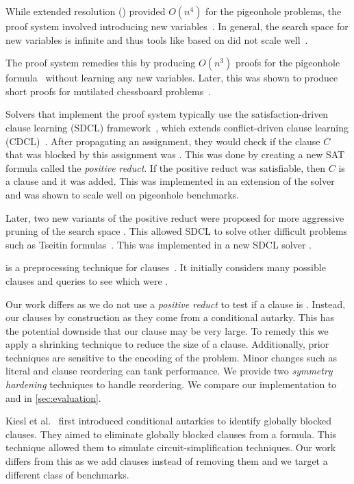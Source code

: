 

 While extended resolution (\er) provided $O(n^4)$ for the pigeonhole problems, the proof system involved introducing new variables~\cite{er}. In general, the search space for new variables is infinite and thus tools like \glucoser based on \er did not scale well~\cite{glucoser}.

The \pr proof system remedies this by producing $O(n^3)$ proofs for the pigeonhole formula~\cite{prclauses} without learning any new variables. Later, this was shown to produce short proofs for mutilated chessboard problems~\cite{mutilatedchessboard-pr}. 

Solvers that implement the \pr proof system typically use the satisfaction-driven clause learning (SDCL) framework~\cite{sdcl}, which extends conflict-driven clause learning (CDCL)~\cite{cdcl}. 
After propagating an assignment, they would check if the clause $C$ that was blocked by this assignment was \pr. This was done by creating a new SAT formula called the \emph{positive reduct}. If the positive reduct was satisfiable, then $C$ is a \pr clause and it was added. This was implemented in an extension of the solver \lingeling and was shown to scale well on pigeonhole benchmarks.

Later, two new variants of the positive reduct were proposed for more aggressive pruning of the search space \cite{sadical}. This allowed SDCL to solve other difficult problems such as Tseitin formulas~\cite{hardexamplesresolution}. This was implemented in a new SDCL solver \sadical.


\prelearn is a preprocessing technique for \pr clauses~\cite{prelearn}. It initially considers many possible clauses and queries \sadical to see which were \pr.

Our work differs as we do not use a \emph{positive reduct} to test if a clause
is \pr. Instead, our clauses \pr by construction as they come from a conditional
autarky. This has the potential downside that our clause may be very large. To
remedy this we apply a shrinking technique to reduce the size of a clause.
Additionally, prior techniques are sensitive to the encoding of the problem.
Minor changes such as literal and clause reordering can tank performance. We
provide two \emph{symmetry hardening} techniques to handle reordering. We
compare our implementation \tool to \sadical and \prelearn in
\autoref{sec:evaluation}.

Kiesl et al.~\cite{conditionalautarkies} first introduced conditional autarkies to identify globally blocked clauses. They aimed to eliminate globally blocked clauses from a formula. This technique allowed them to simulate circuit-simplification techniques. Our work differs from this as we add clauses instead of removing them and we target a different class of benchmarks.

